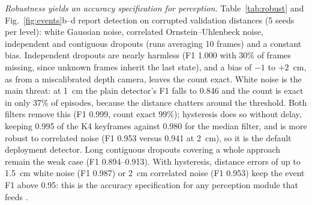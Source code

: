 \emph{Robustness yields an accuracy specification for perception.} Table~\ref{tab:robust} and Fig.~\ref{fig:events}b--d report detection on corrupted validation distances (5 seeds per level): white Gaussian noise, correlated Ornstein--Uhlenbeck noise, independent and contiguous dropouts (runs averaging 10 frames) and a constant bias. Independent dropouts are nearly harmless (F1 1.000 with 30\% of frames missing, since unknown frames inherit the last state), and a bias of $-1$ to $+2$~cm, as from a miscalibrated depth camera, leaves the count exact. White noise is the main threat: at 1~cm the plain detector's F1 falls to 0.846 and the count is exact in only 37\% of episodes, because the distance chatters around the threshold. Both filters remove this (F1 0.999, count exact 99\%); hysteresis does so without delay, keeping 0.995 of the K4 keyframes against 0.980 for the median filter, and is more robust to correlated noise (F1 0.953 versus 0.941 at 2~cm), so it is the default deployment detector. Long contiguous dropouts covering a whole approach remain the weak case (F1 0.894--0.913). With hysteresis, distance errors of up to 1.5~cm white noise (F1 0.987) or 2~cm correlated noise (F1 0.953) keep the event F1 above 0.95: this is the accuracy specification for any perception module that feeds \pekm.

